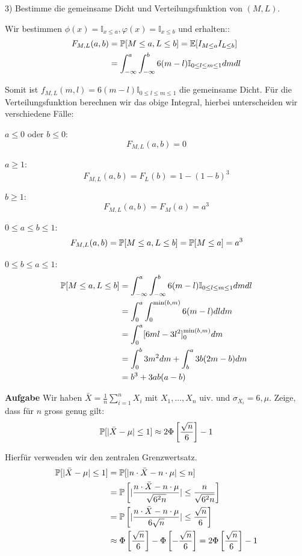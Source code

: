 3) Bestimme die gemeinsame Dicht und Verteilungsfunktion von $(M, L)$.

Wir bestimmen $\phi(x) = \mathbb I_{x \leq a}, \varphi(x) = \mathbb I_{x \leq b}$ und erhalten::
\begin{align*}
	F_{M,L}(a,b) &= \mathbb{P}[M \leq a, L \leq b] = \mathbb{E}[I_{M \leq a} I_{L \leq b}] \\
	&= \int_{-\infty}^a \int_{-\infty}^b 6(m-l) \mathbb I_{0 \leq l \leq m \leq 1} dmdl
\end{align*}

Somit ist $f_{M,L}(m,l) = 6(m-l) \mathbb I_{0 \leq l \leq m \leq 1}$ die gemeinsame Dicht. Für die Verteilungsfunktion berechnen wir das obige Integral, hierbei unterscheiden wir verschiedene Fälle:

$a \leq 0$ oder $b \leq 0$:
$$F_{M,L}(a,b) = 0$$

$a \geq 1$:
$$F_{M,L}(a,b) = F_L(b) = 1 - (1-b)^3$$

$b \geq 1$:
$$F_{M,L}(a,b) = F_M(a) = a^3$$

$0 \leq a \leq b \leq 1$:
$$F_{M,L}(a,b) = \mathbb{P}[M \leq a, L \leq b] = \mathbb{P}[M \leq a] = a^3$$

$0 \leq b \leq a \leq 1$:
\begin{align*}
	\mathbb{P}[M \leq a, L \leq b] &= \int_{-\infty}^a \int_{-\infty}^b 6(m-l) \mathbb I_{0 \leq l \leq m \leq 1} dmdl \\
	&= \int_0^a \int_0^{\min(b, m)} 6(m-l) dldm \\
	&= \int_0^a [6ml - 3l^2]_0^{\min(b, m)} dm \\
	&= \int_0^b 3m^2 dm + \int_b^a 3b(2m - b) dm \\
	&= b^3 + 3ab(a-b)
\end{align*}

\hrulefill

\textbf{Aufgabe}
Wir haben $\bar X = \frac{1}{n} \sum_{i=1}^n X_i$ mit $X_1,...,X_n$ uiv. und $\sigma_{X_i} = 6, \mu$. Zeige, dass für $n$ gross genug gilt:
$$\mathbb{P}[|\bar X - \mu| \leq 1] \approx 2 \Phi \left[\frac{\sqrt{n}}{6} \right] - 1$$

Hierfür verwenden wir den zentralen Grenzwertsatz.
\begin{align*}
	\mathbb{P}[|\bar X - \mu| \leq 1] &= \mathbb{P}[|n \cdot \bar X - n \cdot \mu| \leq n] \\
	&= \mathbb{P} \left[|\frac{n \cdot \bar X - n \cdot \mu}{\sqrt{6^2 n}}| \leq \frac{n}{\sqrt{6^2 n}}\right] \\
	&= \mathbb{P} \left[|\frac{n \cdot \bar X - n \cdot \mu}{6 \sqrt n}| \leq \frac{\sqrt n}{6}\right] \\
	&\approx \Phi \left[ \frac{\sqrt n}{6} \right] - \Phi \left[ -\frac{\sqrt n}{6} \right] = 2 \Phi \left[ \frac{\sqrt n}{6} \right] - 1
\end{align*}

